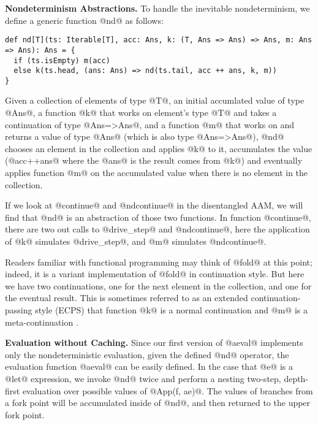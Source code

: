 \documentclass[acmsmall]{acmart}\settopmatter{}
\begin{document}
\textbf{Nondeterminism Abstractions.}
To handle the inevitable nondeterminism, we define a generic function @nd@ as follows:

\begin{lstlisting}
def nd[T](ts: Iterable[T], acc: Ans, k: (T, Ans => Ans) => Ans, m: Ans => Ans): Ans = {
  if (ts.isEmpty) m(acc)
  else k(ts.head, (ans: Ans) => nd(ts.tail, acc ++ ans, k, m))
}
\end{lstlisting}

Given a collection of elements of type @T@, an initial accumlated value of type 
@Ans@, a function @k@ that works on element's type @T@ and takes a continuation 
of type @Ans=>Ans@, and a function @m@ that works on and returns a value of type 
@Ans@ (which is also type @Ans=>Ans@), @nd@ chooses an element in the collection 
and applies @k@ to it, accumulates the value (@acc++ans@ where the @ans@ is the 
result comes from @k@) and eventually applies function @m@ on the accumulated 
value when there is no element in the collection.

If we look at @continue@ and @ndcontinue@ in the disentangled AAM, we will find
that @nd@ is an abstraction of those two functions. In function @continue@,
there are two out calls to @drive_step@ and @ndcontinue@, here the application
of @k@ simulates @drive_step@, and @m@ simulates @ndcontinue@.

Readers familiar with functional programming may think of @fold@ at this point; indeed,
it is a variant implementation of @fold@ in continuation style. But here we have two
continuations, one for the next element in the collection, and one for the eventual result.
This is sometimes referred to as an extended continuation-passing style (ECPS)
that function @k@ is a normal continuation and @m@ is a meta-continuation 
\cite{Danvy:1990:AC:91556.91622}.

\textbf{Evaluation without Caching.}
Since our first version of @aeval@ implements only the nondeterministic evaluation, 
given the defined @nd@ operator, the evaluation function @aeval@ can be easily defined. 
In the case that @e@ is a @let@ expression, we invoke @nd@ twice and perform a nesting 
two-step, depth-first evaluation over possible values of @App(f, ae)@.
The values of branches from a fork point will be accumulated inside of @nd@, and 
then returned to the upper fork point.
\end{document}
